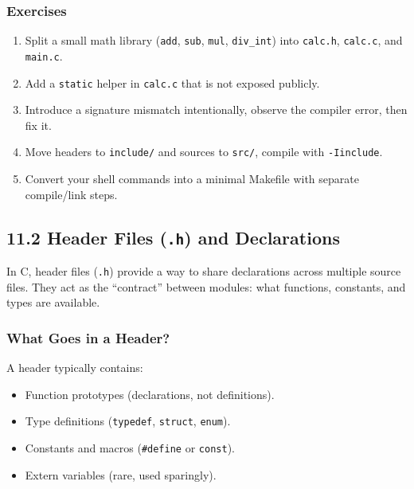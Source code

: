 \documentclass[
  letterpaper,
  DIV=11,
  numbers=noendperiod]{scrreprt}
\providecommand{\tightlist}{%
  \setlength{\itemsep}{0pt}\setlength{\parskip}{0pt}}
\begin{document}
\subsubsection{Exercises}\label{exercises-50}

\begin{enumerate}
\def\labelenumi{\arabic{enumi}.}
\tightlist
\item
  Split a small math library (\texttt{add}, \texttt{sub}, \texttt{mul},
  \texttt{div\_int}) into \texttt{calc.h}, \texttt{calc.c}, and
  \texttt{main.c}.
\item
  Add a \texttt{static} helper in \texttt{calc.c} that is not exposed
  publicly.
\item
  Introduce a signature mismatch intentionally, observe the compiler
  error, then fix it.
\item
  Move headers to \texttt{include/} and sources to \texttt{src/},
  compile with \texttt{-Iinclude}.
\item
  Convert your shell commands into a minimal Makefile with separate
  compile/link steps.
\end{enumerate}

\subsection{\texorpdfstring{11.2 Header Files (\texttt{.h}) and
Declarations}{11.2 Header Files (.h) and Declarations}}\label{header-files-.h-and-declarations}

In C, header files (\texttt{.h}) provide a way to share declarations
across multiple source files. They act as the ``contract'' between
modules: what functions, constants, and types are available.

\subsubsection{What Goes in a Header?}\label{what-goes-in-a-header}

A header typically contains:

\begin{itemize}
\tightlist
\item
  Function prototypes (declarations, not definitions).
\item
  Type definitions (\texttt{typedef}, \texttt{struct}, \texttt{enum}).
\item
  Constants and macros (\texttt{\#define} or \texttt{const}).
\item
  Extern variables (rare, used sparingly).
\end{itemize}
\end{document}
